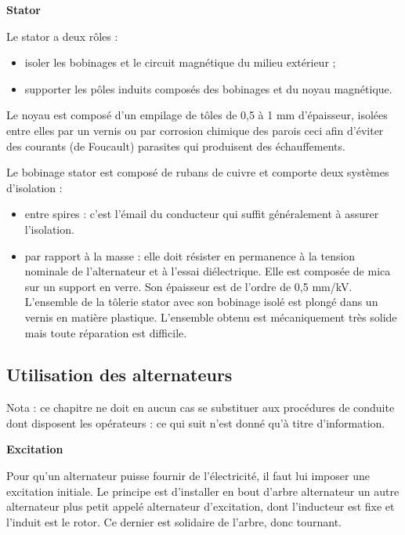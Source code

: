 \textbf{Stator}
\vspace{0.3cm}

Le stator a deux rôles :

\begin{itemize}

\item isoler les bobinages et le circuit magnétique du milieu extérieur ;
\item supporter les pôles induits composés des bobinages et du noyau magnétique.
\end{itemize}

Le noyau est composé d’un empilage de tôles de 0,5 à 1 mm d’épaisseur, isolées entre elles par un vernis ou par corrosion chimique des parois ceci afin d’éviter des courants (de Foucault) parasites qui produisent des échauffements.
\vspace{0.3cm}

Le bobinage stator est composé de rubans de cuivre et comporte deux systèmes d’isolation :


\begin{itemize}

\item entre spires : c’est l’émail du conducteur qui suffit généralement à assurer l’isolation.
\item par rapport à la masse : elle doit résister en permanence à la tension nominale de l’alternateur et à l’essai diélectrique. Elle est composée de mica sur un support en verre. Son épaisseur est de l’ordre de 0,5 mm/kV. L’ensemble de la tôlerie stator avec son bobinage isolé est plongé dans un vernis en matière plastique. L’ensemble obtenu est mécaniquement très solide mais toute réparation est difficile. 
\end{itemize}

\subsection{Utilisation des alternateurs}

Nota : ce chapitre ne doit en aucun cas se substituer aux procédures de conduite dont disposent les opérateurs : ce qui suit n’est donné qu’à titre d’information.

\vspace{0.3cm}

\textbf{Excitation}
\vspace{0.3cm}

Pour qu’un alternateur puisse fournir de l’électricité, il faut lui imposer une excitation initiale. 
Le principe est d’installer en bout d’arbre alternateur un autre alternateur plus petit appelé alternateur d’excitation, dont l’inducteur est fixe et l’induit est le rotor. Ce dernier est solidaire de l’arbre, donc tournant.
\vspace{0.3cm}

